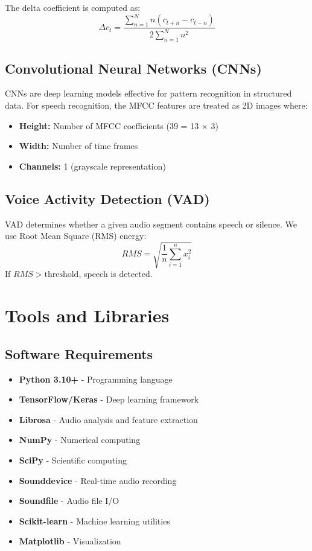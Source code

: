 \documentclass[a4paper,12pt]{article}
\begin{document}
The delta coefficient is computed as:
\begin{equation}
    \Delta c_t = \frac{\sum_{n=1}^{N} n(c_{t+n} - c_{t-n})}{2\sum_{n=1}^{N} n^2}
\end{equation}

\subsection{Convolutional Neural Networks (CNNs)}
CNNs are deep learning models effective for pattern recognition in structured data. For speech recognition, the MFCC features are treated as 2D images where:
\begin{itemize}
    \item \textbf{Height:} Number of MFCC coefficients (39 = 13 × 3)
    \item \textbf{Width:} Number of time frames
    \item \textbf{Channels:} 1 (grayscale representation)
\end{itemize}

\subsection{Voice Activity Detection (VAD)}
VAD determines whether a given audio segment contains speech or silence. We use Root Mean Square (RMS) energy:
\begin{equation}
    RMS = \sqrt{\frac{1}{n}\sum_{i=1}^{n} x_i^2}
\end{equation}
If $RMS > \text{threshold}$, speech is detected.

\section{Tools and Libraries}

\subsection{Software Requirements}
\begin{itemize}
    \item \textbf{Python 3.10+} - Programming language
    \item \textbf{TensorFlow/Keras} - Deep learning framework
    \item \textbf{Librosa} - Audio analysis and feature extraction
    \item \textbf{NumPy} - Numerical computing
    \item \textbf{SciPy} - Scientific computing
    \item \textbf{Sounddevice} - Real-time audio recording
    \item \textbf{Soundfile} - Audio file I/O
    \item \textbf{Scikit-learn} - Machine learning utilities
    \item \textbf{Matplotlib} - Visualization
\end{itemize}
\end{document}
